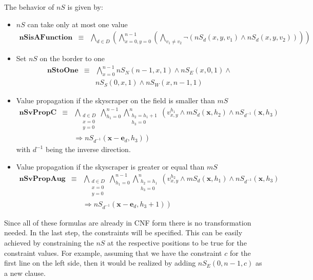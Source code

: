 \documentclass[a4paper, 12pt, titlepage]{article}
\begin{document}
The behavior of $nS$ is given by:
\begin{itemize}
	
\item $nS$ can take only at most one value
	\begin{eqnarray}
		\pmb{nSisAFunction} &\equiv& \bigwedge_{d\in D} \left( \bigwedge_{x=0,y=0}^{n-1} \left( \bigwedge_{v_1 \not = v_2} \neg \left( nS_{d}(x,y,v_1) \wedge nS_{d}(x,y,v_2) \right) \right) \right)
	\end{eqnarray}
	
\item Set $nS$ on the border to one
	\begin{eqnarray}
		\pmb{nStoOne} &\equiv& \bigwedge_{x=0}^{n-1} nS_{N}(n-1,x,1) \wedge nS_{E}(x,0,1) \wedge \nonumber \\
	&&  nS_{S}(0,x,1) \wedge nS_{W}(x,n-1,1)
	\end{eqnarray}
	
\item Value propagation if the skyscraper on the field is smaller than $mS$
	\begin{eqnarray}
		\pmb{nSvPropC} &\equiv& \bigwedge_{\substack{d\in D\\x=0\\y=0}} \bigwedge_{h_{1}=0}^{n-1} \bigwedge_{\substack{h_{2} = h_{1}+1\\h_{3}=0}}^{n} \left( v_{x,y}^{h_1} \wedge mS_d(\pmb x,h_2) \wedge nS_{d^{-1}}(\pmb x,h_3) \right. \nonumber \\
	&& \left.\Rightarrow nS_{d^{-1}}(\pmb x - \pmb e_d,h_3) \right)
	\end{eqnarray}
	with $d^{-1}$ being the inverse direction.

	\item Value propagation if the skyscraper is greater or equal than $mS$
	\begin{eqnarray}
		\pmb{nSvPropAug} &\equiv& \bigwedge_{\substack{d\in D\\x=0\\y=0}} \bigwedge_{h_{1}=0}^{n-1} \bigwedge_{\substack{h_{2} = h_{1}\\h_{3}=0}}^{n} \left( v_{x,y}^{h_2} \wedge mS_d(\pmb x,h_1) \wedge nS_{d^{-1}}(\pmb x,h_3) \right. \nonumber \\
	&& \left.\Rightarrow nS_{d^{-1}}(\pmb x - \pmb e_d,h_3+1) \right)
	\end{eqnarray}
\end{itemize}

Since all of these formulas are already in CNF form there is no transformation needed. In the last step, the constraints will be specified. This can be easily achieved by constraining the $nS$ at the respective positions to be true for the constraint values. For example, assuming that we have the constraint $c$ for the first line on the left side, then it would be realized by adding $nS_{E}(0,n-1,c)$ as a new clause.
\end{document}
